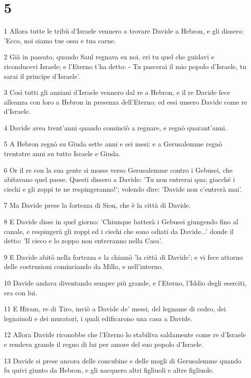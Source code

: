 \chapter{5}

\par 1 Allora tutte le tribù d'Israele vennero a trovare Davide a Hebron, e gli dissero: 'Ecco, noi siamo tue ossa e tua carne.
\par 2 Già in passato, quando Saul regnava su noi, eri tu quel che guidavi e riconducevi Israele; e l'Eterno t'ha detto: - Tu pascerai il mio popolo d'Israele, tu sarai il principe d'Israele'.
\par 3 Così tutti gli anziani d'Israele vennero dal re a Hebron, e il re Davide fece alleanza con loro a Hebron in presenza dell'Eterno; ed essi unsero Davide come re d'Israele.
\par 4 Davide avea trent'anni quando cominciò a regnare, e regnò quarant'anni.
\par 5 A Hebron regnò su Giuda sette anni e sei mesi; e a Gerusalemme regnò trentatre anni su tutto Israele e Giuda.
\par 6 Or il re con la sua gente si mosse verso Gerusalemme contro i Gebusei, che abitavano quel paese. Questi dissero a Davide: 'Tu non entrerai qua; giacché i ciechi e gli zoppi te ne respingeranno!'; volendo dire: 'Davide non c'entrerà mai'.
\par 7 Ma Davide prese la fortezza di Sion, che è la città di Davide.
\par 8 E Davide disse in quel giorno: 'Chiunque batterà i Gebusei giungendo fino al canale, e respingerà gli zoppi ed i ciechi che sono odiati da Davide...' donde il detto: 'Il cieco e lo zoppo non entreranno nella Casa'.
\par 9 E Davide abitò nella fortezza e la chiamò 'la città di Davide'; e vi fece attorno delle costruzioni cominciando da Millo, e nell'interno.
\par 10 Davide andava diventando sempre più grande, e l'Eterno, l'Iddio degli eserciti, era con lui.
\par 11 E Hiram, re di Tiro, inviò a Davide de' messi, del legname di cedro, dei legnaiuoli e dei muratori, i quali edificarono una casa a Davide.
\par 12 Allora Davide riconobbe che l'Eterno lo stabiliva saldamente come re d'Israele e rendeva grande il regno di lui per amore del suo popolo d'Israele.
\par 13 Davide si prese ancora delle concubine e delle mogli di Gerusalemme quando fu quivi giunto da Hebron, e gli nacquero altri figliuoli e altre figliuole.
